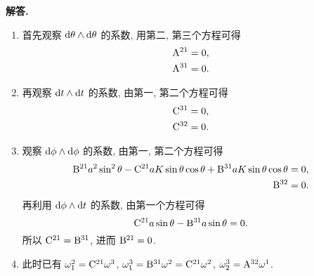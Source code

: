 \documentclass{ctexart}
\newenvironment{solution}{\par\noindent\textbf{解答. }}{\par}
\begin{document}
\begin{solution}
\begin{enumerate}[label = (\roman*)]
        \begin{enumerate}
            \item 首先观察 $\mathop{}\!\mathrm{d} \theta \wedge \mathop{}\!\mathrm{d} \theta$ 的系数, 用第二, 第三个方程可得
            \[
                \begin{aligned}
                    \mathrm{A}^{21} ={}& 0, \\
                    \mathrm{A}^{31} ={}& 0.
                \end{aligned}
            \]
            \item 再观察 $\mathop{}\!\mathrm{d} t \wedge \mathop{}\!\mathrm{d} t$ 的系数, 由第一, 第二个方程可得
            \[
                \begin{aligned}
                    \mathrm{C}^{31} ={}& 0, \\
                    \mathrm{C}^{32} ={}& 0.
                \end{aligned}
            \]
            \item 观察 $\mathop{}\!\mathrm{d} \phi \wedge \mathop{}\!\mathrm{d} \phi$ 的系数, 由第一, 第二个方程可得
            \[
                \begin{aligned}
                    \mathrm{B}^{21} a^2 \sin^2 \theta - \mathrm{C}^{21} a K \sin \theta \cos \theta + \mathrm{B}^{31} a K \sin \theta \cos \theta = 0, \\
                    \mathrm{B}^{32} = 0.
                \end{aligned}
            \]
            再利用 $\mathop{}\!\mathrm{d} \phi \wedge \mathop{}\!\mathrm{d} t$ 的系数, 由第一个方程可得
            \[
                \mathrm{C}^{21} a \sin \theta - \mathrm{B}^{31} a \sin \theta = 0.
            \]
            所以 $\mathrm{C}^{21} = \mathrm{B}^{31}$, 进而 $\mathrm{B}^{21} = 0$.
            \item 此时已有 $\omega^2_1 = \mathrm{C}^{21}\omega^3$, $\omega^3_1 = \mathrm{B}^{31}\omega^2 = \mathrm{C}^{21}\omega^2$, $\omega^3_2 = \mathrm{A}^{32}\omega^1$. 
            

\end{enumerate}
\end{enumerate}
\end{solution}
\end{document}
